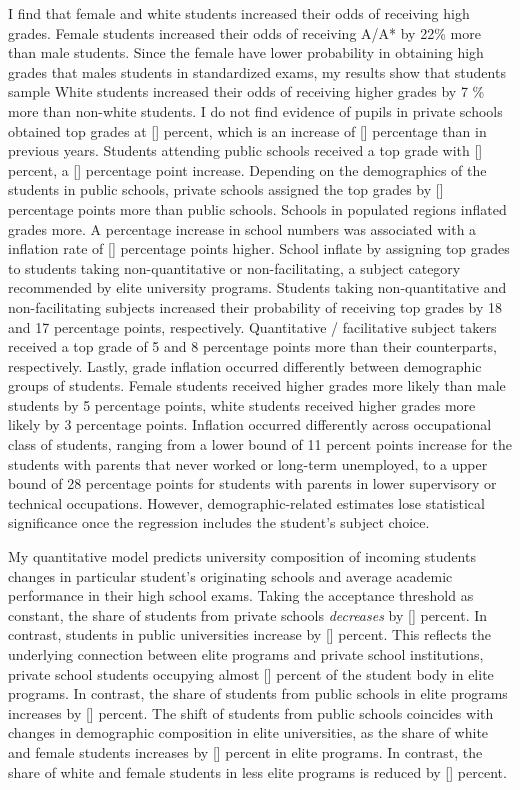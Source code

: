 I find that female and white students increased their odds of receiving high grades. Female students increased their odds of receiving A/A* by 22\% more than male students. Since the female have lower probability in obtaining high grades that males students in standardized exams, my results show that students sample White students increased their odds of receiving higher grades by 7 \% more than non-white students. I do not find evidence of 
pupils in private schools obtained top grades at [] percent, which is an increase of [] percentage than in previous years. Students attending public schools received a top grade with [] percent, a [] percentage point increase. Depending on the demographics of the students in public schools, private schools assigned the top grades by [] percentage points more than public schools. Schools in populated regions inflated grades more. A percentage increase in school numbers was associated with a inflation rate of [] percentage points higher. School inflate by assigning top grades to students taking non-quantitative or non-facilitating, a subject category recommended by elite university programs. Students taking non-quantitative and non-facilitating subjects increased their probability of receiving top grades by 18 and 17 percentage points, respectively. Quantitative / facilitative subject takers received a top grade of 5 and 8 percentage points more than their counterparts, respectively. Lastly, grade inflation occurred differently between demographic groups of students. Female students received higher grades more likely than male students by 5 percentage points, white students received higher grades more likely by 3 percentage points. Inflation occurred differently across occupational class of students, ranging from a lower bound of 11 percent points increase for the students with parents that never worked or long-term unemployed, to a upper bound of 28 percentage points for students with parents in lower supervisory or technical occupations. However, demographic-related estimates lose statistical significance once the regression includes the student's subject choice.

My quantitative model predicts university composition of incoming students changes in particular student's originating schools and average academic performance in their high school exams. Taking the acceptance threshold as constant, the share of students from private schools \emph{decreases} by [] percent. In contrast, students in public universities increase by [] percent. This reflects the underlying connection between elite programs and private school institutions, private school students occupying almost [] percent of the student body in elite programs. In contrast, the share of students from public schools in elite programs increases by [] percent. The shift of students from public schools coincides with changes in demographic composition in elite universities, as the share of white and female students increases by [] percent in elite programs. In contrast, the share of white and female students in less elite programs is reduced by [] percent. 

